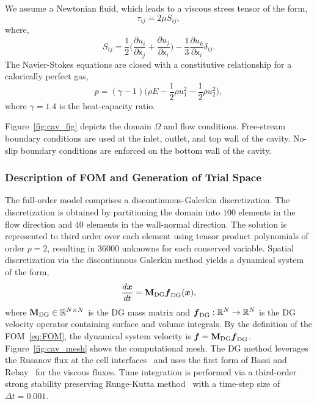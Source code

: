 We assume a Newtonian fluid, which leads to a viscous stress tensor of the form,
\begin{equation*}
\tau_{ij} = 2\mu S_{ij},
\end{equation*}
where,
\begin{equation*}
 S_{ij} = \frac{1}{2} \big( \frac{\partial u_i}{\partial \mathsf{x}_j} + \frac{\partial u_j}{\partial \mathsf{x}_i} \big) - \frac{1}{3} \frac{\partial      u_k}{\partial \mathsf{x}_i} \delta_{ij}.
\end{equation*}
The Navier-Stokes equations are closed with a constitutive relationship for a calorically perfect gas,
$$p = (\gamma - 1)( \rho E - \frac{1}{2} \rho u_1^2 - \frac{1}{2} \rho u_2^2 \big),$$
where $\gamma = 1.4$ is the heat-capacity ratio.

Figure~\ref{fig:cav_fig} depicts the domain $\Omega$ and flow conditions. Free-stream boundary conditions 
are used at the inlet, outlet, and top wall of the cavity. No-slip boundary conditions are enforced 
on the bottom wall of the cavity. 

\subsubsection{Description of FOM and Generation of Trial Space}
The full-order model comprises a discontinuous-Galerkin discretization. The discretization 
is obtained by partitioning the domain into $100$ elements in the flow direction and $40$ elements 
in the wall-normal direction. The solution is represented to third order over each element using tensor product polynomials of order $p=2$, 
resulting in $36000$ unknowns for each conserved variable. Spatial discretization via the discontinuous Galerkin method yields a dynamical system 
of the form,
$$\frac{d \boldsymbol x}{dt} = \mathbf{M}_{\text{DG}} \boldsymbol f_{\text{DG}} (\boldsymbol x),$$
where $\mathbf{M}_{\text{DG}} \in \mathbb{R}^{N \times N}$ is the DG mass matrix and $\boldsymbol f_{\text{DG}}: \mathbb{R}^{N} \rightarrow \mathbb{R}^{N}$ is the DG velocity operator containing 
surface and volume integrals. By the definition of the FOM~\eqref{eq:FOM}, the dynamical system velocity is $\boldsymbol f = \mathbf{M}_{\text{DG}} \boldsymbol f_{\text{DG}}$. 
Figure~\ref{fig:cav_mesh} shows the computational mesh. The 
DG method leverages the Rusanov flux at the cell interfaces~\cite{rusanov} and uses the first form of Bassi and Rebay~\cite{br1} for the viscous fluxes. Time integration 
is performed via a third-order strong stability preserving Runge-Kutta method~\cite{ssp_rk3} with a time-step size of $\Delta t = 0.001$. 
 

